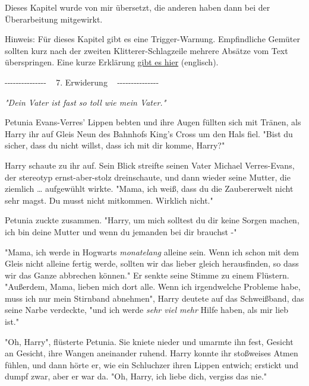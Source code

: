 

\hypertarget{erwiderung}{%

Dieses Kapitel wurde von mir übersetzt, die anderen haben dann bei der Überarbeitung mitgewirkt.

Hinweis: Für dieses Kapitel gibt es eine Trigger-Warnung. Empfindliche Gemüter sollten kurz nach der zweiten Klitterer-Schlagzeile mehrere Absätze vom Text überspringen. Eine kurze Erklärung \href{http://wiki.lesswrong.com/wiki/Methods_Of_Rationality_\%28fanfiction\%29/Nonconsent}{gibt es hier} (englisch).

-\/-\/-\/-\/-\/-\/-\/-\/-\/-\/-\/-\/-\/-\/- ~ 7. Erwiderung ~ -\/-\/-\/-\/-\/-\/-\/-\/-\/-\/-\/-\/-\/-\/-

\emph{"Dein Vater ist fast so toll wie mein Vater."}

\later

Petunia Evans-Verres' Lippen bebten und ihre Augen füllten sich mit Tränen, als Harry ihr auf Gleis Neun des Bahnhofs King's Cross um den Hals fiel. "Bist du sicher, dass du nicht willst, dass ich mit dir komme, Harry?"

Harry schaute zu ihr auf. Sein Blick streifte seinen Vater Michael Verres-Evans, der stereotyp ernst-aber-stolz dreinschaute, und dann wieder seine Mutter, die ziemlich … aufgewühlt wirkte. "Mama, ich weiß, dass du die Zaubererwelt nicht sehr magst. Du musst nicht mitkommen. Wirklich nicht."

Petunia zuckte zusammen. "Harry, um mich solltest du dir keine Sorgen machen, ich bin deine Mutter und wenn du jemanden bei dir brauchst -"

"Mama, ich werde in Hogwarts \emph{monatelang} alleine sein. Wenn ich schon mit dem Gleis nicht alleine fertig werde, sollten wir das lieber gleich herausfinden, so dass wir das Ganze abbrechen können." Er senkte seine Stimme zu einem Flüstern. "Außerdem, Mama, lieben mich dort alle. Wenn ich irgendwelche Probleme habe, muss ich nur mein Stirnband abnehmen", Harry deutete auf das Schweißband, das seine Narbe verdeckte, "und ich werde \emph{sehr viel mehr} Hilfe haben, als mir lieb ist."

"Oh, Harry", flüsterte Petunia. Sie kniete nieder und umarmte ihn fest, Gesicht an Gesicht, ihre Wangen aneinander ruhend. Harry konnte ihr stoßweises Atmen fühlen, und dann hörte er, wie ein Schluchzer ihren Lippen entwich; erstickt und dumpf zwar, aber er war da. "Oh, Harry, ich liebe dich, vergiss das nie."

}
